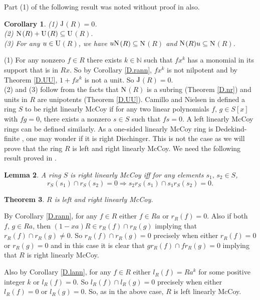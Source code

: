 \documentclass[12pt]{article}
\makeatletter
\theoremstyle{plain}
\newtheorem{thm}{Theorem}[section]
\newtheorem{lemma}[thm]{Lemma}
\newtheorem{cor}[thm]{Corollary}
\theoremstyle{definition}
\renewenvironment{proof}[1][\proofname]{%
	\par\pushQED{\qed}%
	\normalfont %
	\topsep6\p@\@plus6\p@\relax
	\trivlist
	\item[\hskip\labelsep\bfseries #1\@addpunct{.}]%
}{%
	\popQED\endtrivlist\@endpefalse
}
\renewcommand{\proofname}{Proof}
\makeatother
\begin{document}
	Part \textup{(1)} of the following result was noted without proof in \cite{Dit} also.
	\begin{cor}
		\textup{(1)} $\rm{J}$$(R) = 0$.\\[2mm]
		\textup{(2)} $\rm{N}$$(R) + \rm{U}$$(R) \subseteq \rm{U}$$(R).$\\[2mm]
		\textup{(3)} For any $u \in \rm{U}$$(R)$, we have $u \rm{N}$$(R) \subseteq \rm{N}$$(R)$ and $ \rm{N}$$(R)u \subseteq \rm{N}$$(R)$.
	\end{cor}
	\begin{proof}
		(1) For any nonzero $f\in R$ there exists $k\in \mathbb{N}$ such that $fx^k$ has a monomial in its support that is in $Rx$. So by Corollary \ref{D.rann}, $fx^k$ is not nilpotent and by Theorem \ref{D.UU}, $1+fx^k$ is not a unit. So $\rm{J}$$(R) = 0$.\\[2mm]
		(2) and (3) follow from the facts that $\rm{N}$$(R)$ is a subring (Theorem \ref{D.nr}) and units in $R$ are unipotents (Theorem \ref{D.UU}).
	\end{proof}
	Camillo and Nielsen in \cite{CVP} defined a ring $S$ to be right linearly McCoy if for any two linear polynomials $f,\,g\in S[x]$ with $fg = 0$, there exists a nonzero $s\in S$ such that $fs=0$. A left linearly McCoy rings can be defined similarly. As a one-sided linearly McCoy ring is Dedekind-finite \cite[Theorem 5.2]{CVP},  one may wonder if it is right Dischinger. This is not the case as we will prove that the ring $R$ is left and right linearly McCoy. We need the following result proved in \cite[Proposition 3.3]{AD}.
	\begin{lemma}
		A ring $S$ is right linearly McCoy iff for any elements $s_1,\,s_2\in S$, $$r_S(s_1) \cap r_S(s_2) = 0 \Rightarrow s_2r_S(s_1) \cap s_1r_S(s_2) = 0.$$
	\end{lemma}
	\begin{thm}
		$R$ is left and right linearly McCoy.
	\end{thm}
	\begin{proof}
		By Corollary \ref{D.rann}, for any $f \in R$ either $f \in Ra$ or $r_R(f) = 0$. Also if both $f,\,g \in Ra$, then $(1-xa)R \in r_R(f) \cap r_R(g)$ implying that $r_R(f) \cap r_R(g) \neq 0$. So $r_R(f) \cap r_R(g)=0$ precisely when either $r_R(f) = 0$ or $r_R(g) = 0$ and in this case it is clear that $gr_R(f) \cap fr_R(g) = 0$ implying that $R$ is right linearly McCoy. 
		
		Also by Corollary \ref{D.lann}, for any $f \in R$ either $l_R(f) = Ra^k$ for some positive integer $k$ or $l_R(f)=0$. So $l_R(f) \cap l_R(g) = 0$ precisely when either $l_R(f) = 0$ or $l_R(g) = 0$. So, as in the above case, $R$ is left linearly McCoy.
	\end{proof}
\end{document}
